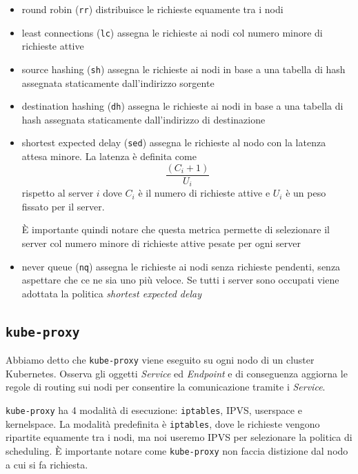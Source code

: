 \documentclass[12pt, hidelinks]{report}
\begin{document}
\begin{itemize}
    \item round robin (\texttt{rr}) distribuisce le richieste equamente tra i nodi
    \item least connections (\texttt{lc}) assegna le richieste ai nodi col numero minore di richieste attive
    \item source hashing (\texttt{sh}) assegna le richieste ai nodi in base a una tabella di hash assegnata staticamente dall'indirizzo sorgente
    \item destination hashing (\texttt{dh}) assegna le richieste ai nodi in base a una tabella di hash assegnata staticamente dall'indirizzo di destinazione
    \item shortest expected delay (\texttt{sed}) assegna le richieste al nodo con la latenza attesa minore. La latenza è definita come 
    \begin{equation}
        \frac{(C_i + 1)}{U_i}
    \end{equation}
    rispetto al server \begin{math} i \end{math} dove \begin{math} C_i \end{math} è il numero di richieste attive e \begin{math} U_i \end{math} è un peso fissato per il server. 
    
    È importante quindi notare che questa metrica permette di selezionare il server col numero minore di richieste attive pesate per ogni server
    \item never queue (\texttt{nq}) assegna le richieste ai nodi senza richieste pendenti, senza aspettare che ce ne sia uno più veloce. Se tutti i server sono occupati viene adottata la politica \textit{shortest expected delay}
\end{itemize}

\subsection{\texttt{kube-proxy}}
Abbiamo detto che \texttt{kube-proxy} viene eseguito su ogni nodo di un cluster Kubernetes. Osserva gli oggetti \textit{Service} ed \textit{Endpoint} e di conseguenza aggiorna le regole di routing sui nodi per consentire la comunicazione tramite i \textit{Service}.

\texttt{kube-proxy} ha 4 modalità di esecuzione: \texttt{iptables}, IPVS, userspace e kernelspace. La modalità predefinita è \texttt{iptables}, dove le richieste vengono ripartite equamente tra i nodi, ma noi useremo IPVS per selezionare la politica di scheduling. È importante notare come \texttt{kube-proxy} non faccia distizione dal nodo a cui si fa richiesta.
\end{document}

